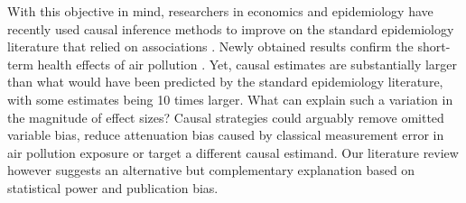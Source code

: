\documentclass[12pt]{article}
\begin{document}

    With this objective in mind, researchers in economics and epidemiology have recently used causal inference methods to improve on the standard epidemiology literature that relied on associations \citep{dominici_best_2017, bind_causal_2019}. Newly obtained results confirm the short-term health effects of air pollution \citep{schwartz_estimating_2015, schwartz_national_2018, deryugina_mortality_2019}. Yet, causal estimates are substantially larger than what would have been predicted by the standard epidemiology literature, with some estimates being 10 times larger.
    What can explain such a variation in the magnitude of effect sizes? 
    Causal strategies could arguably remove omitted variable bias, reduce attenuation bias caused by classical measurement error in air pollution exposure or target a different causal estimand. Our literature review however suggests an alternative but complementary explanation based on statistical power and publication bias.
\end{document}
